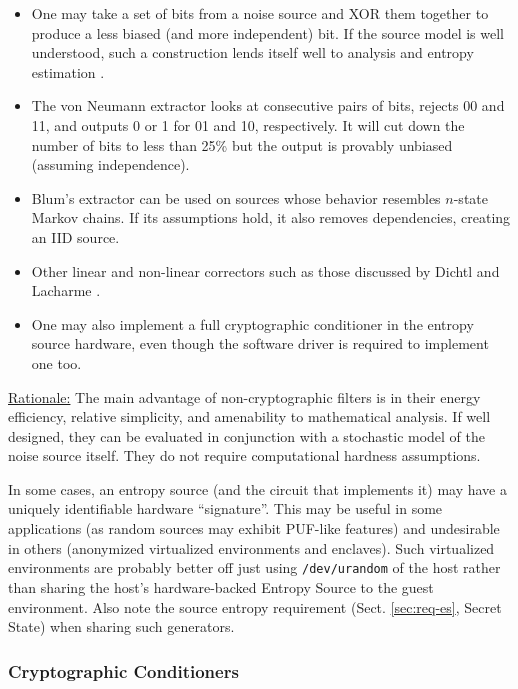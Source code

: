     \begin{itemize}
    \item   One may take a set of bits from a noise source and XOR them
            together to produce a less biased (and more independent) bit.
            If the source model is well understood, such a construction
            lends itself well to analysis and entropy estimation \cite{Da02}.
    \item   The von Neumann extractor \cite{Ne51} looks at consecutive
            pairs of bits, rejects 00 and 11, and outputs 0 or 1 for
            01 and 10, respectively. It will cut down the number of bits to
            less than 25\% but the output is provably unbiased (assuming
            independence).
    \item   Blum's extractor \cite{Bl86} can be used on sources
            whose behavior resembles $n$-state Markov chains. If its
            assumptions hold, it also removes dependencies, creating an IID
            source.
    \item   Other linear and non-linear correctors such as those
            discussed by Dichtl and Lacharme \cite{La08}.
    \item   One may also implement a full cryptographic conditioner
            in the entropy source hardware, even though the software driver
            is required to implement one too.
    \end{itemize}

    \underline{Rationale:}
    The main advantage of non-cryptographic filters is in their
    energy efficiency, relative simplicity, and amenability to mathematical
    analysis. If well designed, they can be evaluated in
    conjunction with a stochastic model of the noise source itself.
    They do not require computational hardness assumptions.

    In some cases, an entropy source (and the circuit that implements it)
    may have a uniquely identifiable hardware ``signature''. This may be
    useful in some applications (as random sources may exhibit PUF-like
    features) and undesirable in others (anonymized virtualized
    environments and enclaves).
    Such virtualized environments are probably better off just using
    \verb|/dev/urandom| of the host rather than sharing the host's
    hardware-backed Entropy Source to the guest environment. Also note the
    source entropy requirement (Sect. \ref{sec:req-es}, Secret State)
    when sharing such generators.


\subsubsection{Cryptographic Conditioners}
\label{sec:crypto-cond}

